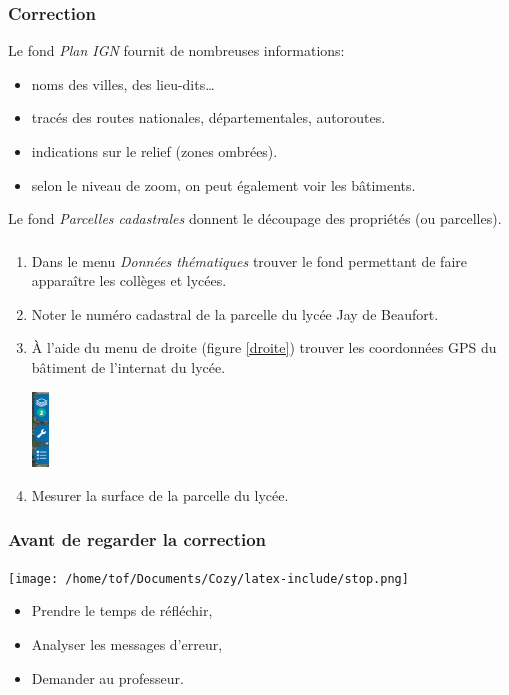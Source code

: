 \documentclass[svgnames,11pt]{beamer}
\begin{document}
\begin{frame}
    \frametitle{Correction}

    Le fond \emph{Plan IGN} fournit de nombreuses informations:
    \begin{itemize}
        \item noms des villes, des lieu-dits\dots
        \item tracés des routes nationales, départementales, autoroutes.
        \item indications sur le relief (zones ombrées).
        \item selon le niveau de zoom, on peut également voir les bâtiments.
    \end{itemize}
Le fond \emph{Parcelles cadastrales} donnent le découpage des propriétés (ou parcelles).

\end{frame}
\begin{frame}
    \frametitle{}

    \begin{activite}
        \begin{enumerate}
            \item Dans le menu \emph{Données thématiques} trouver le fond permettant de faire apparaître les collèges et lycées.
            \item Noter le numéro cadastral de la parcelle du lycée Jay de Beaufort.
            \item À l'aide du menu de droite (figure \ref{droite}) trouver les coordonnées GPS du bâtiment de l'internat du lycée.
            \begin{center}
            \centering
            \includegraphics[height=2cm]{ressources/droite.png}
            \label{droite}
            \end{center}
            \item Mesurer la surface de la parcelle du lycée.
        \end{enumerate}
        \end{activite}

\end{frame}
\begin{frame}
    \frametitle{Avant de regarder la correction}
\begin{center}
    \centering
    \texttt{[image: /home/tof/Documents/Cozy/latex-include/stop.png]}
    \end{center}
{\Large
    \begin{itemize}
        \item Prendre le temps de réfléchir,
        \item Analyser les messages d'erreur,
        \item Demander au professeur.
    \end{itemize}
}
\end{frame}
\end{document}
